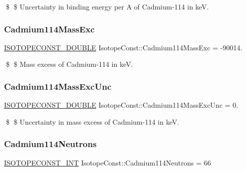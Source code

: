 \$ \$ Uncertainty in binding energy per A of Cadmium-\/114 in keV. \mbox{\label{group___isotope_const-_cadmium-_cd114_gafe12267f413c876a2553f8ff8598c98d}} 
\subsubsection{\texorpdfstring{Cadmium114\+Mass\+Exc}{Cadmium114MassExc}}
{\footnotesize\ttfamily \mbox{\hyperlink{group___isotope_const-_macros_ga8f45a7272ce02c0b4c65c44636ed719a}{I\+S\+O\+T\+O\+P\+E\+C\+O\+N\+S\+T\+\_\+\+D\+O\+U\+B\+LE}} Isotope\+Const\+::\+Cadmium114\+Mass\+Exc = -\/90014.}

\$ \$ Mass excess of Cadmium-\/114 in keV. \mbox{\label{group___isotope_const-_cadmium-_cd114_ga42a5610a0a1fa34440b10f4cb2b39da2}} 
\subsubsection{\texorpdfstring{Cadmium114\+Mass\+Exc\+Unc}{Cadmium114MassExcUnc}}
{\footnotesize\ttfamily \mbox{\hyperlink{group___isotope_const-_macros_ga8f45a7272ce02c0b4c65c44636ed719a}{I\+S\+O\+T\+O\+P\+E\+C\+O\+N\+S\+T\+\_\+\+D\+O\+U\+B\+LE}} Isotope\+Const\+::\+Cadmium114\+Mass\+Exc\+Unc = 0.}

\$ \$ Uncertainty in mass excess of Cadmium-\/114 in keV. \mbox{\label{group___isotope_const-_cadmium-_cd114_ga06ba1887fdc09963d05c6058df8bcdec}} 
\subsubsection{\texorpdfstring{Cadmium114\+Neutrons}{Cadmium114Neutrons}}
{\footnotesize\ttfamily \mbox{\hyperlink{group___isotope_const-_macros_ga5f18360b3e99483a35c32d789e62621c}{I\+S\+O\+T\+O\+P\+E\+C\+O\+N\+S\+T\+\_\+\+I\+NT}} Isotope\+Const\+::\+Cadmium114\+Neutrons = 66}

